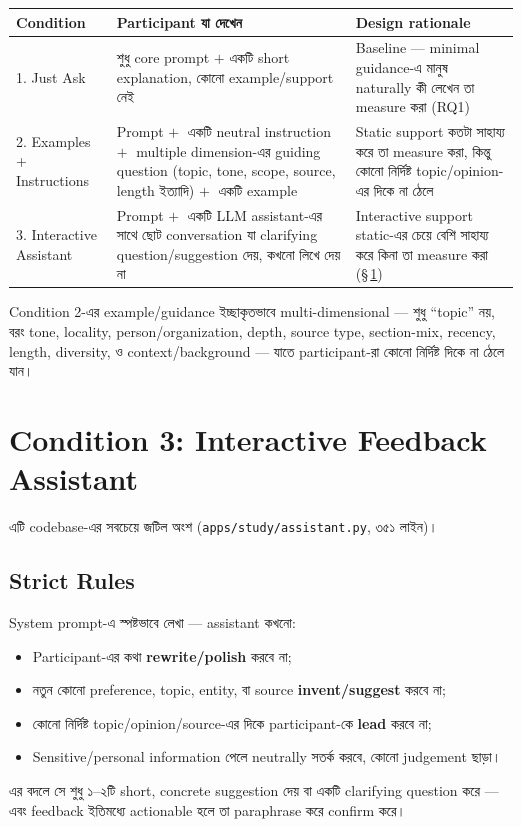 \documentclass[11pt,a4paper]{article}
\newcommand{\file}[1]{\texttt{\small #1}}
\begin{document}
\begin{longtable}{@{}p{2.4cm}p{6.4cm}p{7.0cm}@{}}
\toprule
\textbf{Condition} & \textbf{Participant যা দেখেন} & \textbf{Design rationale} \\
\midrule
\endhead
1. Just Ask & শুধু core prompt \;$+$\; একটি short explanation, কোনো example/support নেই &
  Baseline --- minimal guidance-এ মানুষ naturally কী লেখেন তা measure করা (RQ1) \\
2. Examples + Instructions & Prompt \;$+\;$ একটি neutral instruction \;$+\;$ multiple
  dimension-এর guiding question (topic, tone, scope, source, length ইত্যাদি) \;$+\;$ একটি
  example & Static support কতটা সাহায্য করে তা measure করা, কিন্তু কোনো নির্দিষ্ট topic/opinion-এর
  দিকে না ঠেলে \\
3. Interactive Assistant & Prompt \;$+\;$ একটি LLM assistant-এর সাথে ছোট conversation যা
  clarifying question/suggestion দেয়, কখনো লিখে দেয় না & Interactive support static-এর চেয়ে
  বেশি সাহায্য করে কিনা তা measure করা (\S\,\ref{sec:c3}) \\
\bottomrule
\end{longtable}

Condition 2-এর example/guidance ইচ্ছাকৃতভাবে multi-dimensional --- শুধু ``topic'' নয়, বরং
tone, locality, person/organization, depth, source type, section-mix, recency, length,
diversity, ও context/background --- যাতে participant-রা কোনো নির্দিষ্ট দিকে না ঠেলে যান।

\newpage
\section{Condition 3: Interactive Feedback Assistant}
\label{sec:c3}

এটি codebase-এর সবচেয়ে জটিল অংশ (\file{apps/study/assistant.py}, ৩৫১ লাইন)।

\subsection{Strict Rules}
System prompt-এ স্পষ্টভাবে লেখা --- assistant কখনো:
\begin{itemize}
\item Participant-এর কথা \textbf{rewrite/polish} করবে না;
\item নতুন কোনো preference, topic, entity, বা source \textbf{invent/suggest} করবে না;
\item কোনো নির্দিষ্ট topic/opinion/source-এর দিকে participant-কে \textbf{lead} করবে না;
\item Sensitive/personal information পেলে neutrally সতর্ক করবে, কোনো judgement ছাড়া।
\end{itemize}
এর বদলে সে শুধু ১--২টি short, concrete suggestion দেয় বা একটি clarifying question করে ---
এবং feedback ইতিমধ্যে actionable হলে তা paraphrase করে confirm করে।
\end{document}
